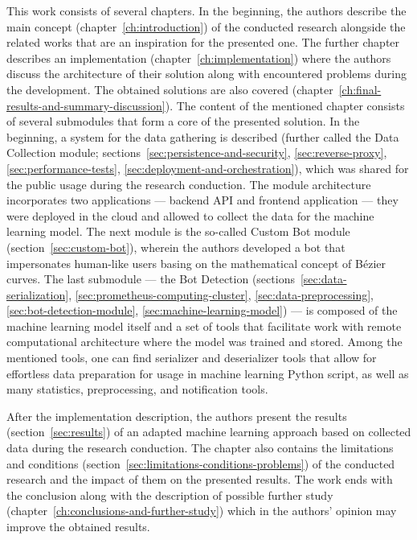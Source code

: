 This work consists of several chapters.
In the beginning, the authors describe the main concept (chapter~\ref{ch:introduction}) of the conducted research alongside the related works that are an inspiration for the presented one.
The further chapter describes an implementation (chapter~\ref{ch:implementation}) where the authors discuss the architecture of their solution along with encountered problems during the development.
The obtained solutions are also covered (chapter~\ref{ch:final-results-and-summary-discussion}).
The content of the mentioned chapter consists of several submodules that form a core of the presented solution.
In the beginning, a system for the data gathering is described (further called the Data Collection module; sections~\ref{sec:persistence-and-security}, \ref{sec:reverse-proxy}, \ref{sec:performance-tests}, \ref{sec:deployment-and-orchestration}), which was shared for the public usage during the research conduction.
The module architecture incorporates two applications --- backend API and frontend application --- they were deployed in the cloud and allowed to collect the data for the machine learning model.
The next module is the so-called Custom Bot module (section~\ref{sec:custom-bot}), wherein the authors developed a bot that impersonates human-like users basing on the mathematical concept of Bézier curves.
The last submodule --- the Bot Detection (sections~\ref{sec:data-serialization}, \ref{sec:prometheus-computing-cluster}, \ref{sec:data-preprocessing}, \ref{sec:bot-detection-module}, \ref{sec:machine-learning-model}) --- is composed of the machine learning model itself and a set of tools that facilitate work with remote computational architecture where the model was trained and stored.
Among the mentioned tools, one can find serializer and deserializer tools that allow for effortless data preparation for usage in machine learning Python script, as well as many statistics, preprocessing, and notification tools.

After the implementation description, the authors present the results (section~\ref{sec:results}) of an adapted machine learning approach based on collected data during the research conduction.
The chapter also contains the limitations and conditions (section~\ref{sec:limitations-conditions-problems}) of the conducted research and the impact of them on the presented results.
The work ends with the conclusion along with the description of possible further study (chapter~\ref{ch:conclusions-and-further-study}) which in the authors' opinion may improve the obtained results.
